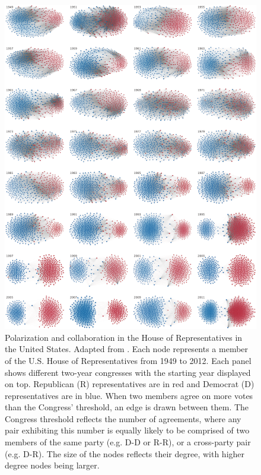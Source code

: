 \documentclass[11pt]{article}
\begin{document}
\begin{figure}[H]
    \centering
    \includegraphics[width=.6\linewidth]{../plots/references/us_parlament.png}
  \caption{Polarization and collaboration in the House of Representatives in the United States. Adapted from \protect{}. Each node represents a member of the U.S. House of Representatives from 1949 to 2012. Each panel shows different two-year congresses with the starting year displayed on top. Republican (R) representatives are in red and Democrat (D) representatives are in blue. When two members agree on more votes than the Congress' threshold, an edge is drawn between them. The Congress threshold reflects the number of agreements, where any pair exhibiting this number is equally likely to be comprised of two members of the same party (e.g. D-D or R-R), or a cross-party pair (e.g. D-R). The size of the nodes reflects their degree, with higher degree nodes being larger.}
  \label{fig:house_of_reps}
\end{figure}
\end{document}
